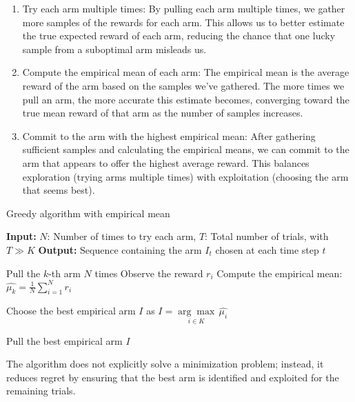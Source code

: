 \begin{enumerate}
    \item Try each arm multiple times: By pulling each arm multiple times, we gather more samples of the rewards for each arm. This allows us to better estimate the true expected reward of each arm, reducing the chance that one lucky sample from a suboptimal arm misleads us.

    \item Compute the empirical mean of each arm: The empirical mean is the average reward of the arm based on the samples we've gathered. The more times we pull an arm, the more accurate this estimate becomes, converging toward the true mean reward of that arm as the number of samples increases.

    \item Commit to the arm with the highest empirical mean: After gathering sufficient samples and calculating the empirical means, we can commit to the arm that appears to offer the highest average reward. This balances exploration (trying arms multiple times) with exploitation (choosing the arm that seems best).

\end{enumerate}

\begin{algorithm}
    \caption{Greedy algorithm with empirical mean}
    \begin{algorithmic}[1]
        \State \textbf{Input:} $N$: Number of times to try each arm, $T$: Total number of trials, with $T \gg K$
        \State \textbf{Output:} Sequence containing the arm $I_t$ chosen at each time step $t$

        \State Pull the $k$-th arm $N$ times
        \State Observe the reward $r_i$
        \EndFor
        \State Compute the empirical mean: $\hat{\mu_k} = \frac{1}{N} \sum_{i=1}^{N} r_i$
        \EndFor

        \State Choose the best empirical arm $I$ as $I = \underset{i \in K}{\arg\max} \, \hat{\mu_i}$

        \State Pull the best empirical arm $I$
        \EndFor

    \end{algorithmic}
\end{algorithm}

\begin{warningbox}
    The algorithm does not explicitly solve a minimization problem; instead, it reduces regret by ensuring that the best arm is identified and exploited for the remaining trials.
\end{warningbox}

